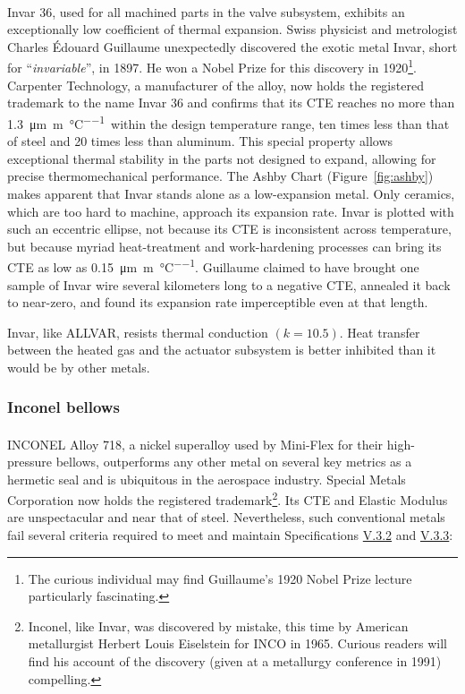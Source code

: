 \documentclass[12pt, letterpaper]{report}%
\newcounter{mycounter}           %
\newcounter{sub}[mycounter]      %
\newcommand{\specInvarCTE}{\SI{1.3}{\micro\meter\per\meter\per\celsius}}
\newcommand{\specref}[1]{\hyperref[tab:specs]{#1}}
\begin{document}
				Invar 36\textsuperscript{{\textregistered{}}}\cite{ref_Carpenter_Inv}, used for all machined parts in the valve subsystem, exhibits an exceptionally low coefficient of thermal expansion.
				Swiss physicist and metrologist Charles \'{E}douard Guillaume unexpectedly discovered the exotic metal Invar, short for ``\textit{invariable}'', in 1897\cite{ref_Invar_1897}.
				He won a Nobel Prize for this discovery in 1920\footnote{
					The curious individual may find Guillaume's 1920 Nobel Prize lecture\cite{ref_Invar_1920} particularly fascinating.
				}\cite{ref_Invar_1920}.
				Carpenter Technology\cite{ref_Carpenter_gen}, a manufacturer of the alloy, now holds the registered trademark to the name Invar 36 and confirms that its CTE reaches no more than \specInvarCTE\ within the design temperature range\cite{ref_Carpenter_Inv},
				ten times less than that of steel\cite{ref_ASM_Steel} and 20 times less than aluminum\cite{ref_NASA_specs_Al}.
				This special property allows exceptional thermal stability in the parts not designed to expand, allowing for precise thermomechanical performance.
				The Ashby Chart (Figure~\ref{fig:ashby}) makes apparent that Invar stands alone as a low-expansion metal. Only ceramics, which are too hard to machine, approach its expansion rate.
				Invar is plotted with such an eccentric ellipse, not because its CTE is inconsistent across temperature, but because myriad heat-treatment and work-hardening processes can bring its CTE as low as \SI{0.15}{\micro\meter\per\meter\per\celsius}.
				Guillaume claimed to have brought one sample of Invar wire several kilometers long to a negative CTE, annealed it back to near-zero, and found its expansion rate imperceptible even at that length\cite[p.~452]{ref_Invar_1920}.

				Invar, like ALLVAR, resists thermal conduction $(k = 10.5)$. Heat transfer between the heated gas and the actuator subsystem is better inhibited than it would be by other metals.

			\subsubsection{Inconel bellows}
			\label{subsubsec:design:just:mat:Inc}

				INCONEL\textsuperscript{{\textregistered{}}}\cite{ref_SpecialMetals_Inc} Alloy 718, a nickel superalloy used by Mini-Flex for their high-pressure bellows, outperforms any other metal on several key metrics as a hermetic seal and is ubiquitous in the aerospace industry\cite[p.~1]{ref_SpecialMetals_Inc}.
				Special Metals Corporation\cite{ref_SpecialMetals_gen} now holds the registered trademark\footnote{
					Inconel, like Invar, was discovered by mistake, this time by American metallurgist Herbert Louis Eiselstein for INCO in 1965\cite{ref_Inconel_1965}.
					Curious readers will find his account of the discovery (given at a metallurgy conference in 1991) compelling\cite{ref_Inconel_1991}.}.
				Its CTE and Elastic Modulus are unspectacular and near that of steel.
				Nevertheless, such conventional metals fail several criteria required to meet and maintain Specifications \specref{V.3.2} and \specref{V.3.3}:
\end{document}
